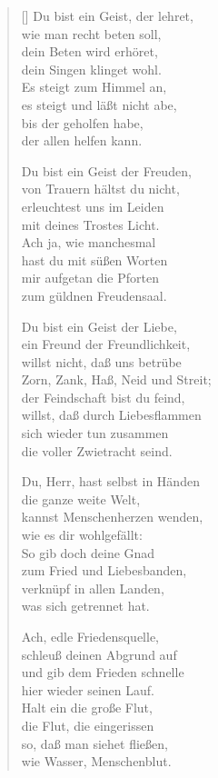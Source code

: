 \begin{multicols}{2}
\begin{verse}[\versewidth]
 Du bist ein Geist, der lehret,\\
wie man recht beten soll,\\
dein Beten wird erhöret,\\
dein Singen klinget wohl.\\
Es steigt zum Himmel an,\\
es steigt und läßt nicht abe,\\
bis der geholfen habe,\\
der allen helfen kann.

 Du bist ein Geist der Freuden,\\
von Trauern hältst du nicht,\\
erleuchtest uns im Leiden\\
mit deines Trostes Licht.\\
Ach ja, wie manchesmal\\
hast du mit süßen Worten\\
mir aufgetan die Pforten\\
zum güldnen Freudensaal.

 Du bist ein Geist der Liebe,\\
ein Freund der Freundlichkeit,\\
willst nicht, daß uns betrübe\\
Zorn, Zank, Haß, Neid und Streit;\\
der Feindschaft bist du feind,\\
willst, daß durch Liebesflammen\\
sich wieder tun zusammen\\
die voller Zwietracht seind.

 Du, Herr, hast selbst in Händen\\
die ganze weite Welt,\\
kannst Menschenherzen wenden,\\
wie es dir wohlgefällt:\\
So gib doch deine Gnad\\
zum Fried und Liebesbanden,\\
verknüpf in allen Landen,\\
was sich getrennet hat.

 Ach, edle Friedensquelle,\\
schleuß deinen Abgrund auf\\
und gib dem Frieden schnelle\\
hier wieder seinen Lauf.\\
Halt ein die große Flut,\\
die Flut, die eingerissen\\
so, daß man siehet fließen,\\
wie Wasser, Menschenblut.


\end{verse}
\end{multicols}
